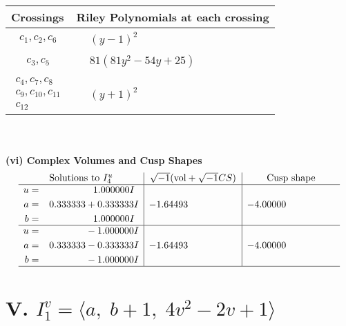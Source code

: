 \documentclass[1p]{elsarticle_modified}
\theoremstyle{definition}
\newcommand{\I}{\sqrt{-1}}
\begin{document}
\begin{tabular}{m{50pt}|m{274pt}}
Crossings & \hspace{64pt}Riley Polynomials at each crossing \\
\hline $$\begin{aligned}c_{1},c_{2},c_{6}\end{aligned}$$&$\begin{aligned}
&(y-1)^2
\end{aligned}$\\
\hline $$\begin{aligned}c_{3},c_{5}\end{aligned}$$&$\begin{aligned}
&81(81 y^2-54 y+25)
\end{aligned}$\\
\hline $$\begin{aligned}c_{4},c_{7},c_{8}\\c_{9},c_{10},c_{11}\\c_{12}\end{aligned}$$&$\begin{aligned}
&(y+1)^2
\end{aligned}$\\
\hline
\end{tabular}\\~\\
\newpage\flushleft \textbf{(vi) Complex Volumes and Cusp Shapes}
$$\begin{array}{c|c|c}  
\text{Solutions to }I^u_{4}& \I (\text{vol} + \sqrt{-1}CS) & \text{Cusp shape}\\
 \hline 
\begin{aligned}
u &= \phantom{-0.000000 -}1.000000 I \\
a &= \phantom{-}0.333333 + 0.333333 I \\
b &= \phantom{-0.000000 -}1.000000 I\end{aligned}
 & -1.64493\phantom{ +0.000000I} & -4.00000\phantom{ +0.000000I} \\ \hline\begin{aligned}
u &= \phantom{-0.000000 } -1.000000 I \\
a &= \phantom{-}0.333333 - 0.333333 I \\
b &= \phantom{-0.000000 } -1.000000 I\end{aligned}
 & -1.64493\phantom{ +0.000000I} & -4.00000\phantom{ +0.000000I}\\
 \hline 
 \end{array}$$\newpage\newpage\renewcommand{\arraystretch}{1}
\centering \section*{V. $I^v_{1}= \langle a,\;b+1,\;4 v^2-2 v+1 \rangle$}
\end{document}
